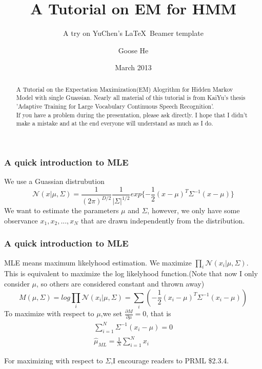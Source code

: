 \documentclass{beamer}
\title{A Tutorial on EM for HMM}
\subtitle{A try on YuChen's \LaTeX~Beamer template}
\author{Goose He}
\date{March 2013}
\begin{document}
\begin{frame}
\titlepage
\end{frame}

\begin{frame}

\begin{abstract}
A Tutorial on the Expectation Maximization(EM) Alogrithm for Hidden Markov Model with single Guassian. Nearly all material of this tutorial is from KaiYu's thesis 'Adaptive Training for Large Vocabulary Continuous Speech Recognition'.\\
If you have a problem during the presentation, please \alert{ask directly}. I hope that I didn't make a mistake and at the end everyone will understand as much as I do.

\end{abstract}

\end{frame}

\begin{frame}
\frametitle{A quick introduction to MLE}
We use a Guassian distrubution 
\begin{equation}
\mathcal{N}(x | \mu, \Sigma) = \frac{1}{(2\pi)^{D/2}}\frac{1}{|\Sigma|^{1/2}}exp\{-\frac{1}{2}(x-\mu)^T\Sigma^{-1}(x-\mu)\}
\end{equation}
We want to estimate the parameters $\mu$ and $\Sigma$, however, we only have some observance $x_1, x_2, ... , x_N$ that are drawn independently from the distribution.
\end{frame}

\begin{frame}
\frametitle{A quick introduction to MLE}
MLE means maximum likelyhood estimation. We maximize $\prod_i \mathcal{N}(x_i|\mu, \Sigma)$. This is equivalent to maximize the log likelyhood function.(Note that now I only consider $\mu$, so others are considered constant and thrown away)
\begin{equation}
M(\mu, \Sigma) = log\prod_i \mathcal{N}(x_i|\mu, \Sigma) = \sum_i(-\frac{1}{2}(x_i-\mu)^T\Sigma^{-1}(x_i-\mu))
\end{equation}
To maximize with respect to $\mu$,we set $\frac{\partial M}{\partial \mu}=0$, that is
\begin{equation}
\begin{split}
\sum_{i=1}^{N}\Sigma^{-1}(x_i-\mu) = 0 \\
\hat{\mu}_{ML}=\frac{1}{N}\sum_{i=1}^{N}x_i
\end{split}
\end{equation}
\end{frame}
\begin{frame}
For maximizing with respect to $\Sigma$,I encourage readers to PRML \$2.3.4.
\end{frame}
\end{document}

